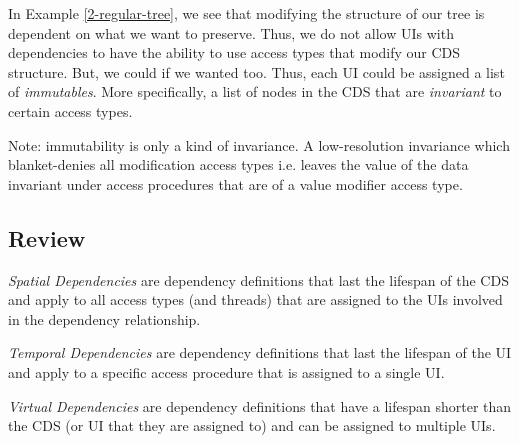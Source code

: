 In Example \ref{2-regular-tree}, we see that modifying the structure of our tree is dependent on what we want to preserve. Thus, we do not allow UIs with dependencies to have the ability to use access types that modify our CDS structure. But, we could if we wanted too. Thus, each UI could be assigned a list of \textit{immutables}. More specifically, a list of nodes in the CDS that are \textit{invariant} to certain access types.

Note: immutability is only a kind of invariance. A low-resolution invariance which blanket-denies all modification access types i.e. leaves the value of the data invariant under access procedures that are of a value modifier access type.

\subsection{Review}

\textit{Spatial Dependencies} are dependency definitions that last the lifespan of the CDS and apply to all access types (and threads) that are assigned to the UIs involved in the dependency relationship.

\textit{Temporal Dependencies} are dependency definitions that last the lifespan of the UI and apply to a specific access procedure that is assigned to a single UI.

\textit{Virtual Dependencies} are dependency definitions that have a lifespan shorter than the CDS (or UI that they are assigned to) and can be assigned to multiple UIs.




